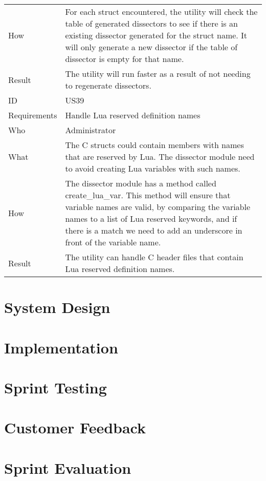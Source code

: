 \begin{table}[htbp]
{\begin{tabularx}{1.2\textwidth}{l X}
	How & For each struct encountered, the utility will check the table of generated dissectors to see if there is an existing dissector generated 			for the struct name. It will only generate a new dissector if the table of dissector is empty for that name. \\
	Result & The utility will run faster as a result of not needing to regenerate dissectors. \\
	\midrule
	ID & US39 \\
	Requirements & Handle Lua reserved definition names \\
	Who & Administrator \\
	What & The C structs could contain members with names that are reserved by Lua. The dissector module need to avoid creating Lua 				variables with such names.  \\
	How &	 The dissector module has a method called create\_lua\_var. This method will ensure that variable names are valid, by comparing the 			variable names to a list of Lua reserved keywords, and if there is a match we need to add an underscore in front of the variable name. \\ 
	Result & The utility can handle C header files that contain Lua reserved definition names. \\
	\bottomrule
\end{tabularx}}
\end{table}

\section{System Design}


\section{Implementation}


\section{Sprint Testing}


\section{Customer Feedback}


\section{Sprint Evaluation}


